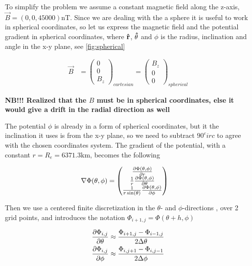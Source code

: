 \documentclass[x11names]{article}
\renewcommand{\va}{\vec}
\begin{document}
    To simplify the problem we assume a constant magnetic field along the z-axis, \(\va{B} = (0,0,45000) \si{\nano\tesla}\). Since we are dealing with the a sphere it is useful to work in spherical coordinates, so let us express the magnetic field and the potential gradient in spherical coordinates, where \(\vu{r}\), \(\vu{\theta}\) and \(\phi\) is the radius, inclination and angle in the x-y plane, see \cref{fig:spherical}

    \begin{align}
      \va{B} &= 
      \begin{pmatrix}
        0 \\ 0 \\ B_z
      \end{pmatrix}_{cartesian}
            =
      \begin{pmatrix}
        B_z 
        \\
        0
        \\
        0
      \end{pmatrix}_{spherical}
    \end{align} 

    \textbf{NB!!! Realized that the \(B\) must be in spherical coordinates, else it would give a drift in the radial direction as well}

    \noindent The potential \(\phi\) is already in a form of spherical coordinates, but it the inclination it uses is from the x-y plane, so we need to subtract \(90^circ\) to agree with the chosen coordinates system. The gradient of the potential, with a constant \(r = R_e = 6371.3 \si{\kilo \meter}\), becomes the following

    \begin{align}
      \nabla \Phi(\theta,\phi) &= 
      \begin{pmatrix}
        \pdv{\Phi(\theta,\phi)}{r}
        \\
        \frac{1}{r} \pdv{\Phi(\theta,\phi)}{\theta}
        \\
        \frac{1}{r\sin(\theta)} \pdv{\Phi(\theta,\phi)}{\phi}
      \end{pmatrix}
    \end{align}

    \noindent Then we use a centered finite discretization in the \(\theta\)- and \(\phi\)-directions , over 2 grid points, and introduces the notation \(\Phi_{i+1,j} = \Phi(\theta + h, \phi)\)

    \begin{align}
      \pdv{\Phi_{i,j}}{\theta} &\approx \frac{ \Phi_{i+1, j} - \Phi_{i - 1, j} }{2 \Delta \theta}
      \\
      \pdv{\Phi_{i,j}}{\phi} &\approx \frac{ \Phi_{i, j + 1} - \Phi_{i , j - 1} }{2\Delta \phi}
    \end{align}
\end{document}

